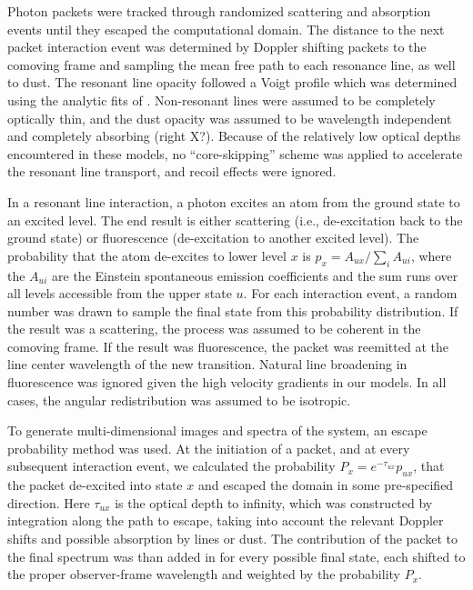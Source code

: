 \documentclass[12pt,preprint]{aastex}
\begin{document}
Photon packets were tracked through randomized scattering and absorption events until they escaped the computational domain.  The distance to the next packet interaction event was determined by Doppler shifting packets to the comoving frame and sampling the mean free path to each resonance line, as well to dust.  The resonant line opacity followed a Voigt profile which was determined using the analytic fits of  \cite{Tomi_2006}.      Non-resonant lines were assumed to be completely optically thin, and the dust opacity was assumed to be wavelength independent and completely absorbing (right X?).   Because of the relatively low optical depths encountered in these models, no ``core-skipping'' scheme was applied to accelerate the resonant line transport,  and recoil effects were ignored.

In a resonant line interaction, a photon excites an atom from the ground state to an excited level.  The end result is either scattering (i.e., de-excitation back to the ground state) or fluorescence (de-excitation to another excited  level).  The probability that the atom de-excites to lower level $x$ is  $p_{x} = A_{ux} / \sum_i A_{ui}$, where the $A_{ui}$ are the Einstein spontaneous emission coefficients and the sum runs over all levels accessible from the upper state $u$.  
For each interaction event, a random number was drawn to sample the final state from this probability distribution.    If the result was a scattering, the process was assumed to be coherent in the comoving frame.  If the result was fluorescence, the packet was  reemitted at the line center wavelength of the new transition.  Natural line broadening in fluorescence was ignored given the high velocity gradients in our models.  In all cases, the angular redistribution was  assumed to be isotropic.

To generate multi-dimensional images and spectra of the system, an escape probability method was used.  At the initiation of a packet, and at every subsequent interaction event, we calculated the probability $P_x = e^{-\tau_{ux}} p_{ux}$,  that the packet de-excited into state $x$ and escaped the domain in some pre-specified direction. Here
$\tau_{ux}$ is the optical depth to infinity, which was  constructed  by integration along the path to escape, taking into account the relevant Doppler shifts and possible absorption by lines or dust.  The contribution of the packet to the final spectrum was than added in for every possible final state, each shifted to the proper observer-frame wavelength and weighted by the probability $P_x$.
\end{document}
